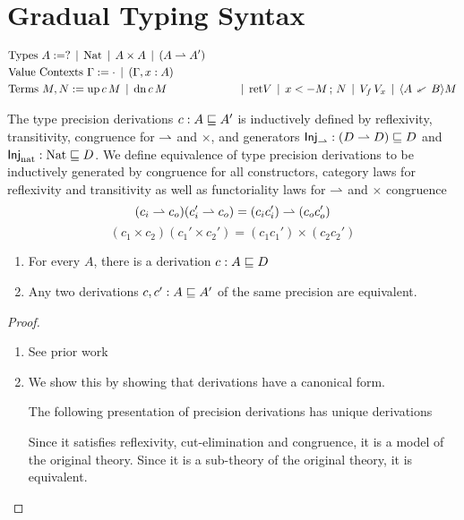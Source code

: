 \section{Gradual Typing Syntax}


\begin{align*} %
  &\text{Types } A := \dyn \alt \nat \alt A \times A \alt (A \ra A') \\
  &\text{Value Contexts } \Gamma := \cdot \alt (\Gamma, x : A) \\
  &\text{Terms } M, N := \upc c M \alt \dnc c M
  &\quad\quad \alt \ret {V} \alt \bind{x}{M}{N} \alt V_f\, V_x \alt \dn{A}{B} M 
\end{align*}

The type precision derivations $c : A \ltdyn A'$ is inductively defined by
reflexivity, transitivity, congruence for $\ra$ and $\times$, and generators
$\textsf{Inj}_\ra : (D \ra D) \ltdyn D$ and $\textsf{Inj}_{\text{nat}}
: \nat \ltdyn D$.
%
We define equivalence of type precision derivations to be inductively generated by congruence for all constructors, category laws for reflexivity and transitivity as well as functoriality laws for $\ra$ and $\times$ congruence
\[ (c_i \ra c_o)(c_i' \ra c_o) = (c_ic_i') \ra (c_oc_o') \]
\[ (c_1 \times c_2)(c_1' \times c_2') = (c_1c_1') \times (c_2c_2') \]

\begin{theorem}
  \begin{enumerate}
  \item For every $A$, there is a derivation $c : A \ltdyn D$
  \item Any two derivations $c,c' : A \ltdyn A'$ of the same precision
    are equivalent.
  \end{enumerate}
\end{theorem}
\begin{proof}
  \begin{enumerate}
  \item See prior work \cite{prior-work}
  \item We show this by showing that derivations have a canonical
    form.

    The following presentation of precision derivations has unique derivations
    \begin{mathpar}
    \end{mathpar}
    Since it satisfies reflexivity, cut-elimination and congruence, it
    is a model of the original theory. Since it is a sub-theory of the
    original theory, it is equivalent.
  \end{enumerate}
\end{proof}

